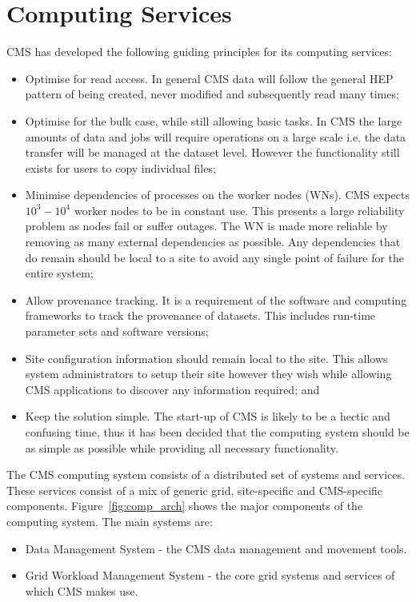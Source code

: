 \section{Computing Services}
CMS has developed the following guiding principles for its computing services:
\begin{itemize}
\item Optimise for read access. In general CMS data will follow the general HEP pattern of being created, never modified and subsequently read many times;
\item Optimise for the bulk case, while still allowing basic tasks. In CMS the large amounts of data and jobs will require operations on a large scale i.e. the data transfer will be managed at the dataset level. However the functionality still exists for users to copy individual files;
\item Minimise dependencies of processes on the worker nodes (WNs). CMS expects $10^{3} - 10^{4}$ worker nodes to be in constant use. This presents a large reliability problem as nodes fail or suffer outages. The WN is made more reliable by removing as many external dependencies as possible. Any dependencies that do remain should be local to a site to avoid any single point of failure for the entire system;
\item Allow provenance tracking. It is a requirement of the software and computing frameworks to track the provenance of datasets. This includes run-time parameter sets and software versions;
\item Site configuration information should remain local to the site. This allows system administrators to setup their site however they wish while allowing CMS applications to discover any information required; and
\item Keep the solution simple. The start-up of CMS is likely to be a hectic and confusing time, thus it has been decided that the computing system should be as simple as possible while providing all necessary functionality.
\end{itemize}

The CMS computing system consists of a distributed set of systems and services. These services consist of a mix of generic grid, site-specific and CMS-specific components. Figure~\ref{fig:comp_arch} shows the major components of the computing system. The main systems are:
\begin{itemize}
\item Data Management System - the CMS data management and movement tools.
\item Grid Workload Management System - the core grid systems and services of which CMS makes use.
\end{itemize}


